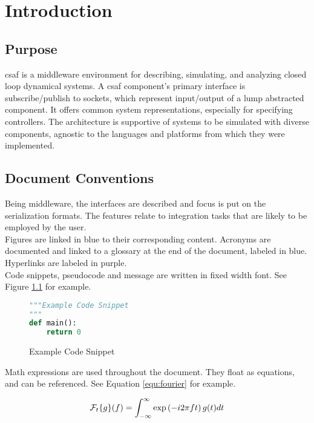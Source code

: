 \chapter{Introduction}

\section{Purpose}
\acrshort{csaf} is a middleware environment for describing, simulating, and analyzing closed loop dynamical 
systems. A \acrshort{csaf} component's primary interface is subscribe/publish to sockets, which represent 
input/output of a lump abstracted component. It offers common system representations, especially for 
specifying controllers. The architecture is supportive of systems to be simulated with diverse components, 
agnostic to the languages and platforms from which they were implemented.


\section{Document Conventions}

Being middleware, the interfaces are described and focus is put on the serialization formats. The features 
relate to integration tasks that are likely to be employed by the user. \\

Figures are linked in blue to their corresponding content. Acronyms are documented and linked to a glossary 
at the end of the document, labeled in blue. Hyperlinks are labeled in purple. \\

Code snippets, pseudocode and message are written in fixed width font. See Figure \ref{code:example} for 
example.

\begin{figure}[h]
\centering
\begin{lstlisting}[language=Python]
"""Example Code Snippet
"""
def main():
	return 0
\end{lstlisting}
\caption{Example Code Snippet}
\label{code:example}
\end{figure}

Math expressions are used throughout the document. They float as equations, and can be referenced. See 
Equation \ref{equ:fourier} for example.

\begin{equation} \label{equ:fourier}
\mathcal{F}_t\{g\}(f) = \int_{-\infty}^{\infty} \exp\left({-i 2\pi f t}\right) g(t) dt \\
\end{equation}


